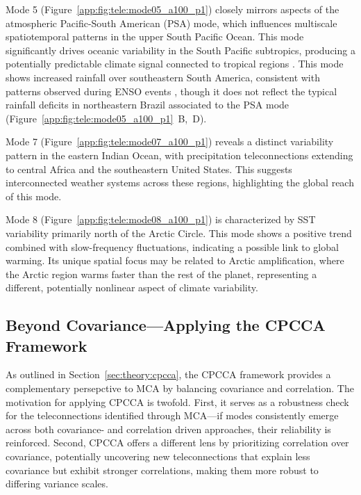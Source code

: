 Mode 5 (Figure~\ref{app:fig:tele:mode05_a100_p1}) closely mirrors aspects of the atmospheric Pacific-South American (PSA) mode, which influences multiscale spatiotemporal patterns in the upper South Pacific Ocean. This mode significantly drives oceanic variability in the South Pacific subtropics, producing a potentially predictable climate signal connected to tropical regions \cite{lou_linking_2021}. This mode shows increased rainfall over southeastern South America, consistent with patterns observed during ENSO events \cite{mo_pacificsouth_2001}, though it does not reflect the typical rainfall deficits in northeastern Brazil associated to the PSA mode  (Figure~\ref{app:fig:tele:mode05_a100_p1}~B,~D).

Mode 7 (Figure~\ref{app:fig:tele:mode07_a100_p1}) reveals a distinct variability pattern in the eastern Indian Ocean, with precipitation teleconnections extending to central Africa and the southeastern United States. This suggests interconnected weather systems across these regions, highlighting the global reach of this mode. 

Mode 8 (Figure~\ref{app:fig:tele:mode08_a100_p1}) is characterized by SST variability primarily north of the Arctic Circle. This mode shows a positive trend combined with slow-frequency fluctuations, indicating a possible link to global warming. Its unique spatial focus may be related to Arctic amplification, where the Arctic region warms faster than the rest of the planet, representing a different, potentially nonlinear aspect of climate variability.

\subsection{Beyond Covariance---Applying the CPCCA Framework}
As outlined in Section~\ref{sec:theory:cpcca}, the CPCCA framework provides a complementary persepctive to MCA by balancing covariance and correlation. The motivation for applying CPCCA is twofold. First, it serves as a robustness check for the teleconnections identified through MCA---if modes consistently emerge across both covariance- and correlation driven approaches, their reliability is reinforced. Second, CPCCA offers a different lens by prioritizing correlation over covariance, potentially uncovering new teleconnections that explain less covariance but exhibit stronger correlations, making them more robust to differing variance scales.


